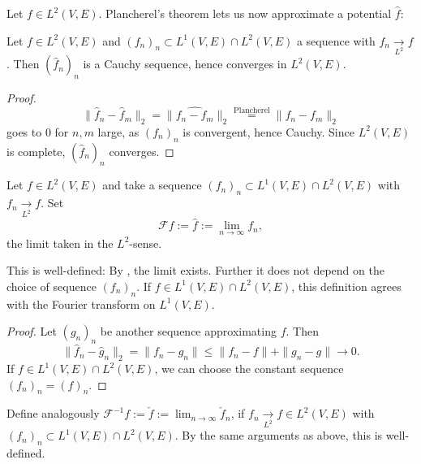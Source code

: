 Let $f\in L^2(V,E)$. Plancherel's theorem lets us now approximate a potential $\widehat f$:
\begin{lemma}
  \label{lem:fourier12-cauchy}
  \lean{}
  Let $f\in L^2(V,E)$ and $(f_n)_n\subset L^1(V,E)\cap L^2(V,E)$ a sequence with $f_n\xrightarrow[L^2]{}f$. Then $(\widehat f_n)_n$ is a Cauchy sequence,
  hence converges in $L^2(V,E)$.
\end{lemma}
\begin{proof}
  $$\|\widehat f_n-\widehat f_m\|_2=\|\widehat{f_n-f_m}\|_2\overset{\text{Plancherel}}=\|f_n-f_m\|_2$$ goes to $0$ for $n,m$ large, as $(f_n)_n$ is
  convergent, hence Cauchy. Since $L^2(V,E)$ is complete, $(\widehat f_n)_n$ converges.
\end{proof}
\begin{definition}
  \label{def:fourier-L2}
  \lean{}
  Let $f\in L^2(V,E)$ and take a sequence $(f_n)_n\subset L^1(V,E)\cap L^2(V,E)$ with $f_n\xrightarrow[L^2]{}f$. Set
  $$\mathcal Ff:=\widehat f:=\lim_{n\to\infty}\widehat{f_n},$$ the limit taken in the $L^2$-sense.
\end{definition}
\begin{lemma}
  \label{lem:fourier2-welldef}
  \lean{}
  This is well-defined: By , the limit exists. Further it does not depend
  on the choice of sequence $(f_n)_n$. If $f\in L^1(V,E)\cap L^2(V,E)$, this definition agrees with
  the Fourier transform on $L^1(V,E)$.
\end{lemma}
\begin{proof}
  Let $(g_n)_n$ be another sequence approximating $f$. Then
  $$\|\widehat f_n-\widehat g_n\|_2=\|f_n-g_n\|\leq\|f_n-f\|+\|g_n-g\|\to0.$$
  If $f\in L^1(V,E)\cap L^2(V,E)$, we can choose the constant sequence $(f_n)_n=(f)_n$.
\end{proof}

\begin{definition}
  \label{def:invFourier-L2}
  \lean{}
  Define analogously $\mathcal F^{-1}f:=\check f:=\lim_{n\to\infty}\check f_n$, if $f_n\xrightarrow[L^2]{}f\in L^2(V,E)$
  with $(f_n)_n\subset L^1(V,E)\cap L^2(V,E)$. By the same arguments as above, this is well-defined.
\end{definition}

